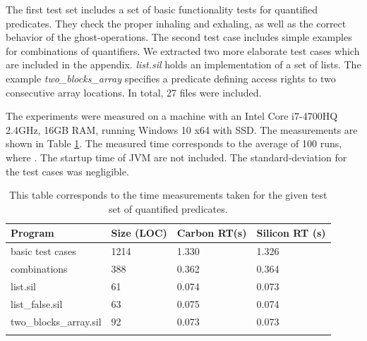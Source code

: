 \documentclass[12pt]{article}
\begin{document}
The first test set includes a set of basic functionality tests for quantified predicates. They check the proper inhaling and exhaling, as well as the correct behavior of the ghost-operations. The second test case includes simple examples for combinations of quantifiers. We extracted two more elaborate test cases which are included in the appendix. \textit{list.sil} holds an implementation of a set of lists. The example \textit{two\_blocks\_array} specifies a predicate defining access rights to two consecutive array locations. In total, 27 files were included.


The experiments were measured on a machine with an Intel Core i7-4700HQ 2.4GHz, 16GB RAM, running Windows 10 x64 with SSD. The measurements are shown in Table \ref{timings}. The measured time corresponds to the average of 100 runs, where . The startup time of JVM are not included. The standard-deviation for the test cases was negligible.

\begin{longtable}{ | p{} | p{}| p{} | p{}|}
\hline
{\bf Program} & {\bf Size (LOC)} & {\bf Carbon RT(s) }&  {\bf Silicon RT (s)} \\ \hline
basic test cases & 1214 & 1.330 & 1.326\\
\hline combinations & 388 & 0.362 & 0.364\\
\hline
list.sil & 61 & 0.074 & 0.073\\
list\_false.sil & 63 & 0.075 & 0.074\\
two\_blocks\_array.sil & 92 & 0.073 & 0.073\\

\hline
\caption[run-time measurements]
   {This table corresponds to the time measurements taken for the given test set of quantified predicates.}
\label{timings}
\end{longtable}
\end{document}
